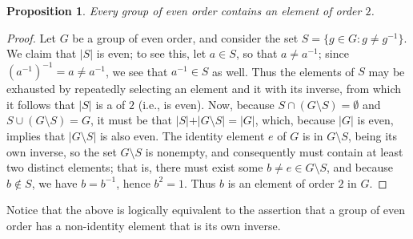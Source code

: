 \documentclass[12pt]{article}
\theoremstyle{plain}
\newtheorem*{proposition*}{Proposition}
\begin{document}
\begin{proposition*}
Every group of even order contains an element of order $2$.
\end{proposition*}
\begin{proof}
Let $G$ be a group of even order, and consider the set $S=\{g\in G:g\neq g^{-1}\}$. We claim that $\vert S\vert$ is even; to see this, let $a\in S$, so that $a\neq a^{-1}$; since $(a^{-1})^{-1}=a\neq a^{-1}$, we see that $a^{-1}\in S$ as well. Thus the elements of $S$ may be exhausted by repeatedly selecting an element and  it with its inverse, from which it follows that $\vert S\vert$ is a  of $2$ (i.e., is even). Now, because $S\cap (G\setminus S)=\emptyset$ and $S\cup(G\setminus S)=G$, it must be that $\vert S\vert+\vert G\setminus S\vert=\vert G\vert$, which, because $\vert G\vert$ is even, implies that $\vert G\setminus S\vert$ is also even. The identity element $e$ of $G$ is in $G\setminus S$, being its own inverse, so the set $G\setminus S$ is nonempty, and consequently must contain at least two distinct elements; that is, there must exist some $b\neq e\in G\setminus S$, and because $b\notin S$, we have $b=b^{-1}$, hence $b^2=1$. Thus $b$ is an element of order $2$ in $G$.
\end{proof}
Notice that the above  is logically equivalent to the assertion that a group of even order has a non-identity element that is its own inverse. 
\end{document}
